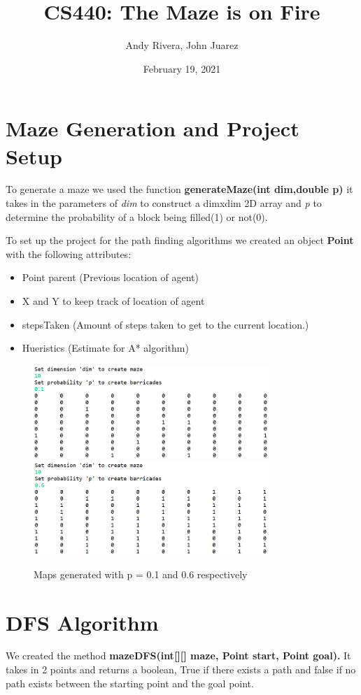 \documentclass{article}
\title{CS440: The Maze is on Fire}
\author{Andy Rivera, John Juarez}
\date{February 19, 2021}
\begin{document}
\maketitle

\section{Maze Generation and Project Setup}
   To generate a maze we used the function \textbf{generateMaze(int dim,double p)} it takes in the parameters of  \textit{dim} to construct a dimxdim 2D array and \textit{p} to determine the probability of a block being filled(1) or not(0).
   
   To set up the project for the path finding algorithms we created an object \textbf{Point} with the following attributes:
   \begin{itemize}
   \item Point parent (Previous location of agent)
   \item X and Y to keep track of location of agent
   \item stepsTaken (Amount of steps taken to get to the current location.)
   \item Hueristics (Estimate for A* algorithm)
   \end{itemize}

\begin{figure}[hbt!]

\centering
\includegraphics[width=3.5in]{maze1}\hfill
\includegraphics[width=3.5in]{maze3}

\caption{Maps generated with p = 0.1 and 0.6 respectively}
\label{fig:figure1}

\end{figure}


\section{DFS Algorithm}
  We created the method \textbf{mazeDFS(int[][] maze, Point start, Point goal).} It takes in 2 points and returns a boolean, True if there exists a path and false if no path exists between the starting point and the goal point. 
	
\end{document}
